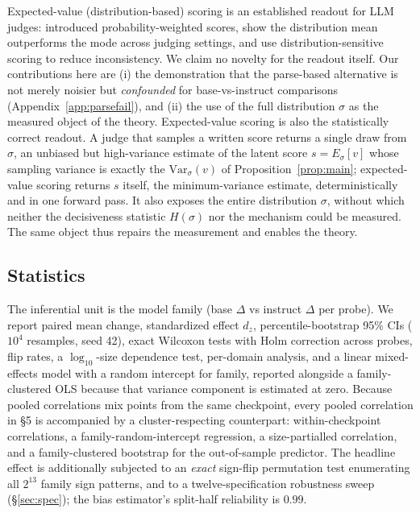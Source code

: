 \documentclass[11pt]{article}
\begin{document}
Expected-value (distribution-based) scoring is an established readout for LLM judges:
\citet{liu2023geval} introduced probability-weighted scores, \citet{wang2025judgmentdist}
show the distribution mean outperforms the mode across judging settings, and
\citet{trustjudge2025} use distribution-sensitive scoring to reduce inconsistency. We
claim no novelty for the readout itself. Our contributions here are (i) the demonstration
that the parse-based alternative is not merely noisier but \emph{confounded} for
base-vs-instruct comparisons (Appendix~\ref{app:parsefail}), and (ii) the use of the full
distribution $\sigma$ as the measured object of the theory. Expected-value scoring is
also the statistically correct readout. A judge that samples a written score returns a single draw from $\sigma$, an
unbiased but high-variance estimate of the latent score $s=E_\sigma[v]$ whose sampling
variance is exactly the $\mathrm{Var}_\sigma(v)$ of Proposition~\ref{prop:main};
expected-value scoring returns $s$ itself, the minimum-variance estimate, deterministically
and in one forward pass. It also exposes the entire distribution $\sigma$, without which
neither the decisiveness statistic $H(\sigma)$ nor the mechanism could be measured. The
same object thus repairs the measurement and enables the theory.

\subsection{Statistics}
The inferential unit is the model family (base $\Delta$ vs instruct $\Delta$ per
probe). We report paired mean change, standardized effect $d_z$, percentile-bootstrap
95\% CIs ($10^4$ resamples, seed 42), exact Wilcoxon tests with Holm correction across
probes, flip rates, a $\log_{10}$-size dependence test, per-domain analysis, and a
linear mixed-effects model with a random intercept for family, reported alongside a
family-clustered OLS because that variance component is estimated at zero. Because pooled
correlations mix points from the same checkpoint, every pooled correlation in \S5 is
accompanied by a cluster-respecting counterpart: within-checkpoint correlations, a
family-random-intercept regression, a size-partialled correlation, and a
family-clustered bootstrap for the out-of-sample predictor. The headline effect is
additionally subjected to an \emph{exact} sign-flip permutation test enumerating all
$2^{13}$ family sign patterns, and to a twelve-specification robustness sweep
(\S\ref{sec:spec}); the bias estimator's split-half reliability is $0.99$.
\end{document}
